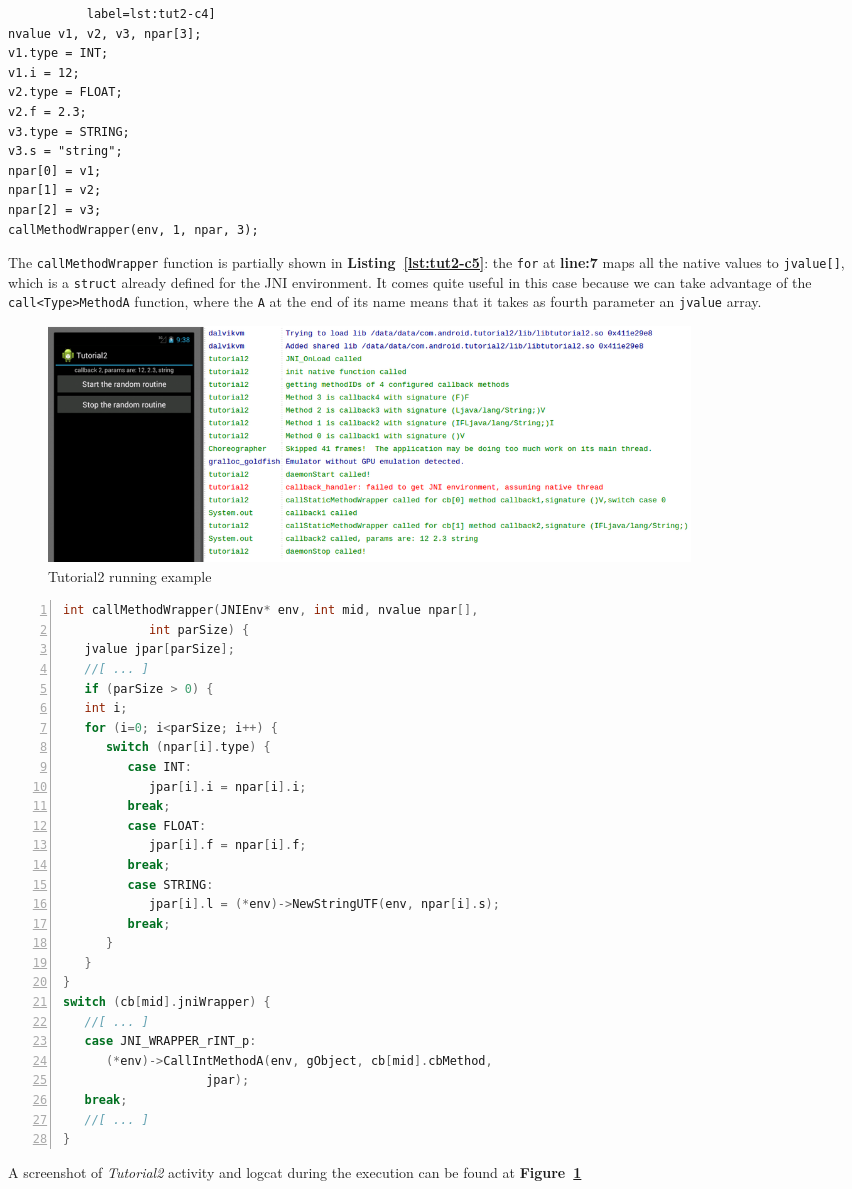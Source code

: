 \documentclass[a4paper,10pt]{article}
\newcommand{\keyword}[1]{\texttt{#1}}
\newcommand{\reff}[1]{\textbf{Figure~\ref{#1}}}
\newcommand{\refl}[1]{\textbf{Listing~\ref{#1}}}
\begin{document}
\begin{multicols}{2}
\begin{lstlisting}
		   label=lst:tut2-c4]
nvalue v1, v2, v3, npar[3];
v1.type = INT;
v1.i = 12;
v2.type = FLOAT;
v2.f = 2.3;
v3.type = STRING;
v3.s = "string";
npar[0] = v1;
npar[1] = v2;
npar[2] = v3;
callMethodWrapper(env, 1, npar, 3);
\end{lstlisting}
The \keyword{callMethodWrapper} function is partially shown in
\refl{lst:tut2-c5}: the \keyword{for} at \textbf{line:7} maps all the native
values to \keyword{jvalue[]}, which is a \keyword{struct} already defined for
the JNI environment. It comes quite useful in this case because we can take
advantage of the \keyword{call<Type>MethodA} function, where the \keyword{A}
at the end of its name means that it takes as fourth parameter an
\keyword{jvalue} array.

\begin{figure}[t]
 \includegraphics[width=17cm]{./figures/tut2-scr1.png}
 \caption{Tutorial2 running example}
 \label{fig:tut2-scr1}
\end{figure}
\begin{lstlisting}[language=C,
		   columns=fullflexible,
		   showstringspaces=false,
		   xleftmargin=15pt,
		   frame = l,
		   numbers=left,
		   commentstyle=\color{gray}\upshape,
		   caption=Part of tutorial2.c - callingMethodWrapper,
		   label=lst:tut2-c5]
int callMethodWrapper(JNIEnv* env, int mid, nvalue npar[],
			int parSize) {
   jvalue jpar[parSize];
   //[ ... ]
   if (parSize > 0) {
   int i;
   for (i=0; i<parSize; i++) {
      switch (npar[i].type) {
         case INT:
            jpar[i].i = npar[i].i;
         break;
         case FLOAT:
            jpar[i].f = npar[i].f;
         break;
         case STRING:
            jpar[i].l = (*env)->NewStringUTF(env, npar[i].s);
         break;
      }
   }
}
switch (cb[mid].jniWrapper) {
   //[ ... ]
   case JNI_WRAPPER_rINT_p:
      (*env)->CallIntMethodA(env, gObject, cb[mid].cbMethod,
      				jpar);
   break;
   //[ ... ]
}
\end{lstlisting}
A screenshot of \textit{Tutorial2} activity and logcat during the execution can
be found at \reff{fig:tut2-scr1}


\end{multicols}
\end{document}
